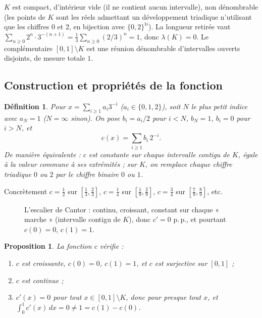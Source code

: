 \documentclass[11pt]{article}
\theoremstyle{thmblue}
\newtheorem{proposition}[theoreme]{Proposition}
\theoremstyle{defplain}
\newtheorem{definition}[theoreme]{Définition}
\theoremstyle{rem}
\newcommand{\N}{\mathbb{N}}
\newcommand{\dx}{\,dx}
\newcommand{\pp}{p.\,p.}
\begin{document}
\noindent
$K$ est compact, d'intérieur vide (il ne contient aucun intervalle), non dénombrable (les points de
$K$ sont les réels admettant un développement triadique n'utilisant que les chiffres $0$ et $2$, en
bijection avec $\{0,2\}^{\N}$). La longueur retirée vaut
$\sum_{n\ge0}2^n\cdot3^{-(n+1)}=\tfrac13\sum_{n\ge0}(2/3)^n=1$, donc $\lambda(K)=0$. Le complémentaire
$[0,1]\setminus K$ est une réunion dénombrable d'intervalles ouverts disjoints, de mesure totale $1$.

\subsection{Construction et propriétés de la fonction}

\begin{definition}\label{def:cantor}
Pour $x=\sum_{i\ge1}a_i3^{-i}$ ($a_i\in\{0,1,2\}$), soit $N$ le plus petit indice avec $a_N=1$
($N=\infty$ sinon). On pose $b_i=a_i/2$ pour $i<N$, $b_N=1$, $b_i=0$ pour $i>N$, et
\[
c(x)=\sum_{i\ge1}b_i\,2^{-i}.
\]
De manière équivalente : $c$ est \emph{constante} sur chaque intervalle contigu de $K$, égale à la
valeur commune à ses extrémités ; sur $K$, on remplace chaque chiffre triadique $0$ ou $2$ par le
chiffre binaire $0$ ou $1$.
\end{definition}

Concrètement $c=\tfrac12$ sur $[\tfrac13,\tfrac23]$, $c=\tfrac14$ sur $[\tfrac19,\tfrac29]$,
$c=\tfrac34$ sur $[\tfrac79,\tfrac89]$, etc.

\begin{figure}[h]
\centering
{}
\caption{L'escalier de Cantor : continu, croissant, constant sur chaque « marche » (intervalle
contigu de $K$), donc $c'=0$ \pp, et pourtant $c(0)=0$, $c(1)=1$.}
\label{fig:cantor}
\end{figure}

\begin{proposition}\label{prop:cantor}
La fonction $c$ vérifie :
\begin{enumerate}[label=\textup{(\alph*)},leftmargin=2.2em,itemsep=1pt]
  \item $c$ est croissante, $c(0)=0$, $c(1)=1$, et $c$ est \emph{surjective} sur $[0,1]$ ;
  \item $c$ est \emph{continue} ;
  \item $c'(x)=0$ pour tout $x\in[0,1]\setminus K$, donc pour presque tout $x$, et
  $\displaystyle\int_0^1 c'(x)\dx=0\neq1=c(1)-c(0)$.
\end{enumerate}
\end{proposition}
\end{document}
